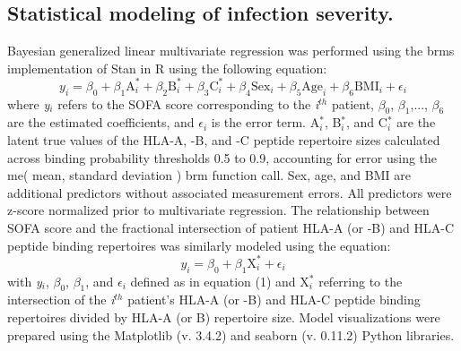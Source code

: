 \documentclass[utf8]{frontiersinFPHY_FAMS} %
\begin{document}
\subsection*{Statistical modeling of infection severity.} Bayesian generalized linear multivariate regression was performed using the brms implementation of Stan in R \citep{RJ-2018-017, Carpenter2017} using the following equation:   
\begin{equation}
y_i = \beta_0 + \beta_1 \text{A}_i^* + \beta_2 \text{B}_i^* + \beta_3 \text{C}_i^* + \beta_4 \text{Sex}_i + \beta_5 \text{Age}_i + \beta_6 \text{BMI}_i + \epsilon_i
\label{eq:01} 
\end{equation} 
where \textit{y}$_\textit{i}$ refers to the SOFA score corresponding to the \textit{i}$^{th}$ patient, $\beta_0$, $\beta_1$,..., $\beta_6$ are the estimated coefficients, and $\epsilon_i$ is the error term. A$_{i}^*$, B$_{i}^*$, and C$_{i}^*$ are the latent true values of the HLA-A, -B, and -C peptide repertoire sizes calculated across binding probability thresholds 0.5 to 0.9, accounting for error using the me( mean, standard deviation ) brm function call. Sex, age, and BMI are additional predictors without associated measurement errors. All predictors were z-score normalized prior to multivariate regression. The relationship between SOFA score and the fractional intersection of patient HLA-A (or -B) and HLA-C peptide binding repertoires was similarly modeled using the equation:
\begin{equation}
y_i = \beta_0 + \beta_1 \text{X}_i^* + \epsilon_i
\label{eq:02} 
\end{equation} 
with \textit{y}$_\textit{i}$, $\beta_0$, $\beta_1$, and $\epsilon_i$ defined as in equation (1) and X$_{i}^*$ referring to the intersection of the \textit{i}$^{th}$ patient's HLA-A (or -B) and HLA-C peptide binding repertoires divided by HLA-A (or B) repertoire size. Model visualizations were prepared using the Matplotlib (v. 3.4.2) and seaborn (v. 0.11.2) Python libraries. 
\end{document}
